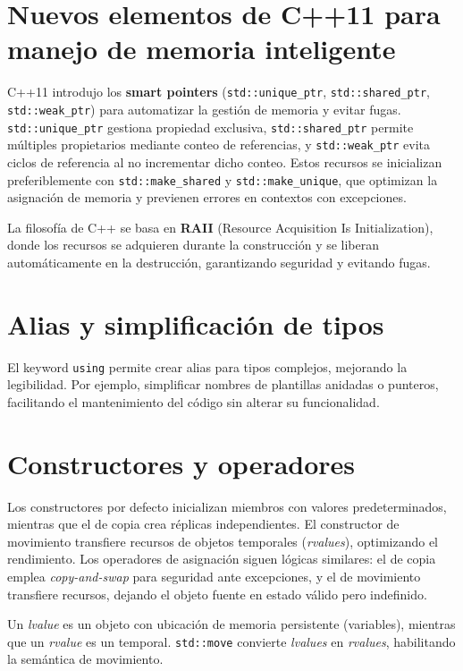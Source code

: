\documentclass{article}
\begin{document}
\section{Nuevos elementos de C++11 para manejo de memoria inteligente}
C++11 introdujo los \textbf{smart pointers} (\texttt{std::unique\_ptr}, \texttt{std::shared\_ptr}, \texttt{std::weak\_ptr}) para automatizar la gesti\'on de memoria y evitar fugas. \texttt{std::unique\_ptr} gestiona propiedad exclusiva, \texttt{std::shared\_ptr} permite m\'ultiples propietarios mediante conteo de referencias, y \texttt{std::weak\_ptr} evita ciclos de referencia al no incrementar dicho conteo. Estos recursos se inicializan preferiblemente con \texttt{std::make\_shared} y \texttt{std::make\_unique}, que optimizan la asignaci\'on de memoria y previenen errores en contextos con excepciones.

La filosof\'ia de C++ se basa en \textbf{RAII} (Resource Acquisition Is Initialization), donde los recursos se adquieren durante la construcci\'on y se liberan autom\'aticamente en la destrucci\'on, garantizando seguridad y evitando fugas.

\section{Alias y simplificaci\'on de tipos}
El keyword \texttt{using} permite crear alias para tipos complejos, mejorando la legibilidad. Por ejemplo, simplificar nombres de plantillas anidadas o punteros, facilitando el mantenimiento del c\'odigo sin alterar su funcionalidad.

\section{Constructores y operadores}
Los constructores por defecto inicializan miembros con valores predeterminados, mientras que el de copia crea r\'eplicas independientes. El constructor de movimiento transfiere recursos de objetos temporales (\textit{rvalues}), optimizando el rendimiento. Los operadores de asignaci\'on siguen l\'ogicas similares: el de copia emplea \textit{copy-and-swap} para seguridad ante excepciones, y el de movimiento transfiere recursos, dejando el objeto fuente en estado v\'alido pero indefinido.

Un \textit{lvalue} es un objeto con ubicaci\'on de memoria persistente (variables), mientras que un \textit{rvalue} es un temporal. \texttt{std::move} convierte \textit{lvalues} en \textit{rvalues}, habilitando la sem\'antica de movimiento.
\end{document}
